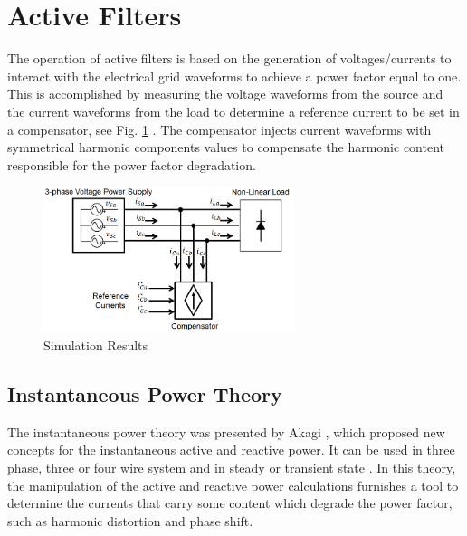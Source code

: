 \section{Active Filters}

The operation of active filters is based on the generation of voltages/currents to interact with the electrical grid waveforms to achieve a power factor equal to one. This is accomplished by measuring the voltage waveforms from the source and the current waveforms from the load to determine a reference current to be set in a compensator, see Fig. \ref{fig:compensador.png} \citep{Akagi2006}. The compensator injects current waveforms with symmetrical harmonic components values to compensate the harmonic content responsible for the power factor degradation.

\begin{figure}[!h]
\centering
\includegraphics[width=0.65\textwidth]{Figures/compensador.png}
\caption{Simulation Results}
\label{fig:compensador.png}
\end{figure}



\subsection{Instantaneous Power Theory}

The instantaneous power theory was presented by Akagi \citep{Akagi1984}, which proposed new concepts for the instantaneous active and reactive power. It can be used in three phase, three or four wire system and in steady or transient state \citep{Akagi2007}. In this theory, the manipulation of the active and reactive power calculations furnishes a tool to determine the currents that carry some content which degrade the power factor, such as harmonic distortion and phase shift.

